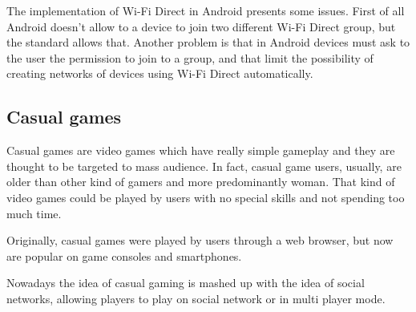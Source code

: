 The implementation of Wi-Fi Direct in Android presents some issues. First of all
Android doesn't allow to a device to join two different Wi-Fi Direct group, but 
the standard allows that. Another problem is that in Android devices must ask 
to the user the permission to join to a group, and that limit the possibility
of creating networks of devices using Wi-Fi Direct automatically.

\subsection{Casual games}
Casual games are video games which have really simple gameplay and they are
thought to be targeted to mass audience. In fact, casual game users, usually, are
older than other kind of gamers and more predominantly woman. That kind of video
games could be played by users with no special skills and not spending too much 
time.

Originally, casual games were played by users through a web browser, but now 
are popular on game consoles and smartphones.

Nowadays the idea of casual gaming is mashed up with the idea of social networks,
allowing players to play on social network or in multi player mode.